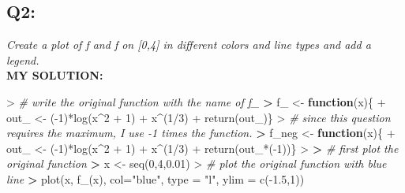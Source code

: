 \documentclass[
]{article}
\newenvironment{Shaded}{\begin{snugshade}}{\end{snugshade}}
\newcommand{\AttributeTok}[1]{\textcolor[rgb]{0.77,0.63,0.00}{#1}}
\newcommand{\CommentTok}[1]{\textcolor[rgb]{0.56,0.35,0.01}{\textit{#1}}}
\newcommand{\ControlFlowTok}[1]{\textcolor[rgb]{0.13,0.29,0.53}{\textbf{#1}}}
\newcommand{\DecValTok}[1]{\textcolor[rgb]{0.00,0.00,0.81}{#1}}
\newcommand{\ErrorTok}[1]{\textcolor[rgb]{0.64,0.00,0.00}{\textbf{#1}}}
\newcommand{\FloatTok}[1]{\textcolor[rgb]{0.00,0.00,0.81}{#1}}
\newcommand{\FunctionTok}[1]{\textcolor[rgb]{0.00,0.00,0.00}{#1}}
\newcommand{\NormalTok}[1]{#1}
\newcommand{\OtherTok}[1]{\textcolor[rgb]{0.56,0.35,0.01}{#1}}
\newcommand{\SpecialCharTok}[1]{\textcolor[rgb]{0.00,0.00,0.00}{#1}}
\newcommand{\StringTok}[1]{\textcolor[rgb]{0.31,0.60,0.02}{#1}}
\begin{document}
\hypertarget{q2}{%
\subsection{Q2:}\label{q2}}

\emph{Create a plot of f and f on {[}0,4{]} in different colors and line
types and add a legend.}\\
\textbf{MY SOLUTION:}

\begin{Shaded}
\begin{Highlighting}[]
\SpecialCharTok{\textgreater{}} \CommentTok{\# write the original function with the name of f\_}
\ErrorTok{\textgreater{}}\NormalTok{ f\_ }\OtherTok{\textless{}{-}} \ControlFlowTok{function}\NormalTok{(x)\{}
\SpecialCharTok{+}\NormalTok{   out\_ }\OtherTok{\textless{}{-}}\NormalTok{ (}\SpecialCharTok{{-}}\DecValTok{1}\NormalTok{)}\SpecialCharTok{*}\FunctionTok{log}\NormalTok{(x}\SpecialCharTok{\^{}}\DecValTok{2} \SpecialCharTok{+} \DecValTok{1}\NormalTok{) }\SpecialCharTok{+}\NormalTok{ x}\SpecialCharTok{\^{}}\NormalTok{(}\DecValTok{1}\SpecialCharTok{/}\DecValTok{3}\NormalTok{)}
\SpecialCharTok{+}   \FunctionTok{return}\NormalTok{(out\_)\}}
\SpecialCharTok{\textgreater{}} \CommentTok{\# since this question requires the maximum, I use {-}1 times the function.}
\ErrorTok{\textgreater{}}\NormalTok{ f\_neg }\OtherTok{\textless{}{-}} \ControlFlowTok{function}\NormalTok{(x)\{}
\SpecialCharTok{+}\NormalTok{   out\_ }\OtherTok{\textless{}{-}}\NormalTok{ (}\SpecialCharTok{{-}}\DecValTok{1}\NormalTok{)}\SpecialCharTok{*}\FunctionTok{log}\NormalTok{(x}\SpecialCharTok{\^{}}\DecValTok{2} \SpecialCharTok{+} \DecValTok{1}\NormalTok{) }\SpecialCharTok{+}\NormalTok{ x}\SpecialCharTok{\^{}}\NormalTok{(}\DecValTok{1}\SpecialCharTok{/}\DecValTok{3}\NormalTok{)}
\SpecialCharTok{+}   \FunctionTok{return}\NormalTok{(out\_}\SpecialCharTok{*}\NormalTok{(}\SpecialCharTok{{-}}\DecValTok{1}\NormalTok{))\}}
\SpecialCharTok{\textgreater{}} 
\ErrorTok{\textgreater{}} \CommentTok{\# first plot the original function}
\ErrorTok{\textgreater{}}\NormalTok{ x }\OtherTok{\textless{}{-}} \FunctionTok{seq}\NormalTok{(}\DecValTok{0}\NormalTok{,}\DecValTok{4}\NormalTok{,}\FloatTok{0.01}\NormalTok{)}
\SpecialCharTok{\textgreater{}} \CommentTok{\# plot the original function with blue line}
\ErrorTok{\textgreater{}} \FunctionTok{plot}\NormalTok{(x, }\FunctionTok{f\_}\NormalTok{(x), }\AttributeTok{col=}\StringTok{"blue"}\NormalTok{, }\AttributeTok{type =} \StringTok{"l"}\NormalTok{, }\AttributeTok{ylim =} \FunctionTok{c}\NormalTok{(}\SpecialCharTok{{-}}\FloatTok{1.5}\NormalTok{,}\DecValTok{1}\NormalTok{))}

\end{Highlighting}
\end{Shaded}
\end{document}
